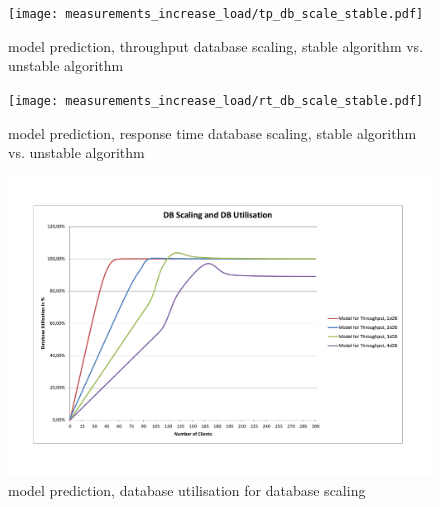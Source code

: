 \documentclass[a4paper]{article}
\begin{document}
\begin{landscape}
\begin{figure}[H]
	\begin{center}
    \texttt{[image: measurements\_increase\_load/tp\_db\_scale\_stable.pdf]}
  \end{center}
  \caption{model prediction, throughput database scaling, stable algorithm vs. unstable algorithm}
  \label{fig:tp-db-scale-stable}
\end{figure}

\begin{figure}[H]
	\begin{center}
    \texttt{[image: measurements\_increase\_load/rt\_db\_scale\_stable.pdf]}
  \end{center}
  \caption{model prediction, response time database scaling, stable algorithm vs. unstable algorithm}
  \label{fig:rt-db-scale-stable}
\end{figure}

\begin{figure}[H]
	\begin{center}
    \includegraphics[scale=0.7, trim = 23mm 28mm 24mm 25mm, clip]{measurements_increase_load/db_utilisation.pdf}
  \end{center}
  \caption{model prediction, database utilisation for database scaling}
  \label{fig:db-utilisation}
\end{figure}


\end{landscape}
\end{document}
